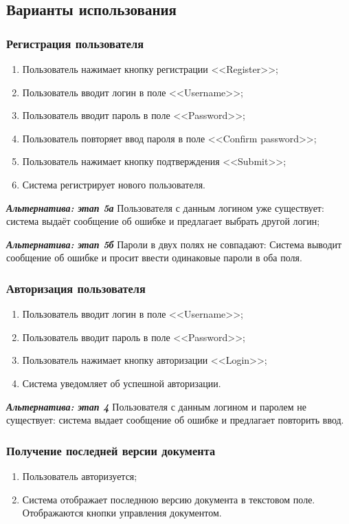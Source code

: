 \subsection{Варианты использования}
	\subsubsection{Регистрация пользователя}
	\begin{enumerate}
		\item Пользователь нажимает кнопку регистрации <<Register>>;
		\item Пользователь вводит логин в поле <<Username>>;
		\item Пользователь вводит пароль в поле <<Password>>;
		\item Пользователь повторяет ввод пароля в поле <<Confirm password>>;
		\item Пользователь нажимает кнопку подтверждения <<Submit>>;
		\item Система регистрирует нового пользователя.
	\end{enumerate}
	
	\textbf{\textit{Альтернатива: этап 5а}} Пользователя с данным логином уже существует: система выдаёт сообщение об ошибке и предлагает выбрать другой логин;
	
	\textbf{\textit{Альтернатива: этап 5б}} Пароли в двух полях не совпадают: Система выводит сообщение об ошибке и просит ввести одинаковые пароли в оба поля.

	\subsubsection{Авторизация пользователя}
	\begin{enumerate}
		\item Пользователь вводит логин в поле <<Username>>;
		\item Пользователь вводит пароль в поле <<Password>>;
		\item Пользователь нажимает кнопку авторизации <<Login>>;
		\item Система уведомляет об успешной авторизации.
	\end{enumerate}
	
	\textbf{\textit{Альтернатива: этап 4}} Пользователя с данным логином и паролем не существует: система выдает сообщение об ошибке и предлагает повторить ввод.
		
	\subsubsection{Получение последней версии документа}
	\begin{enumerate}
		\item Пользователь авторизуется;
		\item Система отображает последнюю версию документа в текстовом поле. Отображаются кнопки управления документом.
	\end{enumerate}
	
